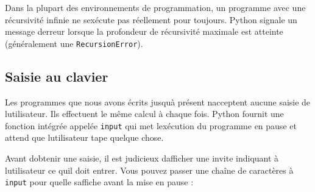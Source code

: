 Dans la plupart des environnements de programmation, un programme avec
une récursivité infinie ne s\textquotesingle exécute pas réellement pour
toujours. Python signale un message d\textquotesingle erreur lorsque la
profondeur de récursivité maximale est atteinte (généralement une
\texttt{RecursionError}).

\hypertarget{saisie-au-clavier}{%
\subsection{Saisie au clavier}\label{saisie-au-clavier}}

Les programmes que nous avons écrits jusqu\textquotesingle à présent
n\textquotesingle acceptent aucune saisie de
l\textquotesingle utilisateur. Ils effectuent le même calcul à chaque
fois. Python fournit une fonction intégrée appelée \texttt{input} qui
met l\textquotesingle exécution du programme en pause et attend que
l\textquotesingle utilisateur tape quelque chose.

\begin{Shaded}
\begin{Highlighting}[]
\OperatorTok{\textgreater{}\textgreater{}\textgreater{}}\OperatorTok{=} \NormalTok{()}
\OperatorTok{\textgreater{}\textgreater{}\textgreater{}} 
\end{Highlighting}
\end{Shaded}

Avant d\textquotesingle obtenir une saisie, il est judicieux
d\textquotesingle afficher une invite indiquant à
l\textquotesingle utilisateur ce qu\textquotesingle il doit entrer. Vous
pouvez passer une chaîne de caractères à \texttt{input} pour
qu\textquotesingle elle s\textquotesingle affiche avant la mise en pause
:

\begin{Shaded}
\begin{Highlighting}[]
\OperatorTok{\textgreater{}\textgreater{}\textgreater{}}\OperatorTok{=} \NormalTok{(}\StringTok{\textquotesingle{}}\NormalTok{)}
\OperatorTok{\textgreater{}\textgreater{}\textgreater{}} 
\end{Highlighting}
\end{Shaded}

